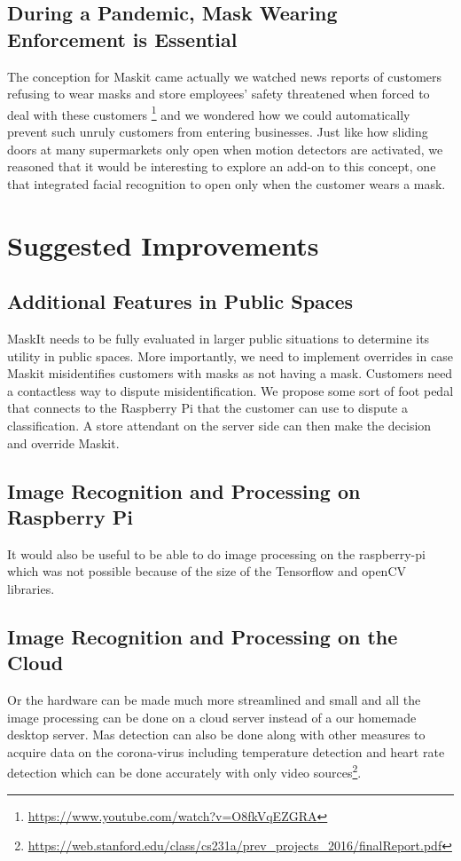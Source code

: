 \documentclass[conference, 12pt, onecolumn]{IEEEtran}
\begin{document}
\subsection{During a Pandemic, Mask Wearing Enforcement is Essential}
The conception for Maskit came actually we watched news reports of customers refusing to wear masks and store employees' safety threatened when forced to deal with these customers \footnote{\url{https://www.youtube.com/watch?v=O8fkVqEZGRA}} and we wondered how we could automatically prevent such unruly customers from entering businesses. Just like how sliding doors at many supermarkets only open when motion detectors are activated, we reasoned that it would be interesting to explore an add-on to this concept, one that integrated facial recognition to open only when the customer wears a mask. 
\section{Suggested Improvements}
\subsection{Additional Features in Public Spaces}
MaskIt needs to be fully evaluated in larger public situations to determine its utility in public spaces. More importantly, we need to implement overrides in case Maskit misidentifies customers with masks as not having a mask. Customers need a contactless way to dispute misidentification. We propose some sort of foot pedal that connects to the Raspberry Pi that the customer can use to dispute a classification. A store attendant on the server side can then make the decision and override Maskit.
\subsection{Image Recognition and Processing on Raspberry Pi}
It would also be useful to be able to do image processing on the raspberry-pi which was not possible because of the size of the Tensorflow and openCV libraries.
\subsection{Image Recognition and Processing on the Cloud}
Or the hardware can be made much more streamlined and small and all the image processing can be done on a cloud server instead of a our homemade desktop server. Mas detection can also be done along with other measures to acquire data on the corona-virus including temperature detection and heart rate detection which can be done accurately with only video sources\footnote{\url{https://web.stanford.edu/class/cs231a/prev_projects_2016/finalReport.pdf}}.
\end{document}
